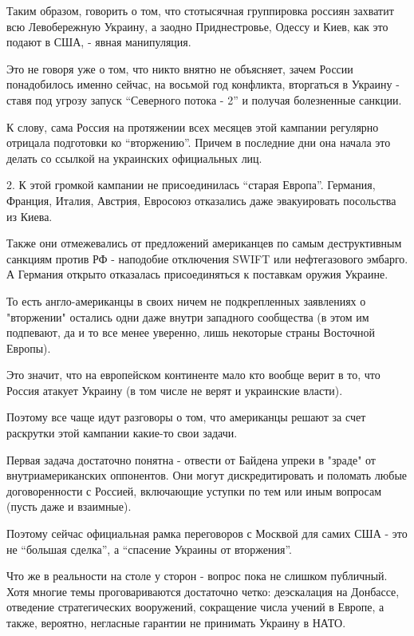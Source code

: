 Таким образом, говорить о том, что стотысячная группировка россиян захватит всю
Левобережную Украину, а заодно Приднестровье, Одессу и Киев, как это подают в
США, - явная манипуляция.

Это не говоря уже о том, что никто внятно не объясняет, зачем России
понадобилось именно сейчас, на восьмой год конфликта, вторгаться в Украину -
ставя под угрозу запуск \enquote{Северного потока - 2} и получая болезненные санкции. 

К слову, сама Россия на протяжении всех месяцев этой кампании регулярно
отрицала подготовки ко \enquote{вторжению}. Причем в последние дни она начала это
делать со ссылкой на украинских официальных лиц.

2. К этой громкой кампании не присоединилась \enquote{старая Европа}. Германия,
Франция, Италия, Австрия, Евросоюз отказались даже эвакуировать посольства из
Киева.

Также они отмежевались от предложений американцев по самым деструктивным
санкциям против РФ - наподобие отключения SWIFT или нефтегазового эмбарго. А
Германия открыто отказалась присоединяться к поставкам оружия Украине. 

То есть англо-американцы в своих ничем не подкрепленных заявлениях о
"вторжении" остались одни даже внутри западного сообщества (в этом им
подпевают, да и то все менее уверенно, лишь некоторые страны Восточной Европы).

Это значит, что на европейском континенте мало кто вообще верит в то, что
Россия атакует Украину (в том числе не верят и украинские власти).

Поэтому все чаще идут разговоры о том, что американцы решают за счет раскрутки
этой кампании какие-то свои задачи.

Первая задача достаточно понятна - отвести от Байдена упреки в "зраде" от
внутриамериканских оппонентов. Они могут дискредитировать и поломать любые
договоренности с Россией, включающие уступки по тем или иным вопросам (пусть
даже и взаимные).

Поэтому сейчас официальная рамка переговоров с Москвой для самих США - это не
\enquote{большая сделка}, а \enquote{спасение Украины от вторжения}.

Что же в реальности на столе у сторон - вопрос пока не слишком публичный. Хотя
многие темы проговариваются достаточно четко: деэскалация на Донбассе,
отведение стратегических вооружений, сокращение числа учений в Европе, а также,
вероятно, негласные гарантии не принимать Украину в НАТО.


